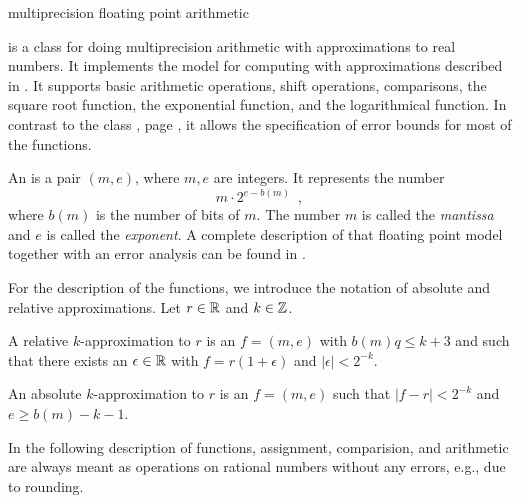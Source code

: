 


\NAME

 \dotfill multiprecision floating point arithmetic



\ABSTRACT

 is a class for doing multiprecision arithmetic with approximations to real
numbers.  It implements the model for computing with approximations described in
\cite{Buchmann/Maurer_TR:1998}.  It supports basic arithmetic operations, shift operations,
comparisons, the square root function, the exponential function, and the logarithmical function.
In contrast to the class , page \pageref{class:bigfloat}, it allows the
specification of error bounds for most of the functions.



\DESCRIPTION

An  is a pair $(m,e)$, where $m,e$ are integers.  It represents the number
\begin{displaymath}
  m \cdot 2^{e-b(m)} \enspace,
\end{displaymath}
where $b(m)$ is the number of bits of $m$.  The number $m$ is called the \emph{mantissa} and $e$
is called the \emph{exponent}.  A complete description of that floating point model together with
an error analysis can be found in \cite{Buchmann/Maurer_TR:1998}.

For the description of the functions, we introduce the notation of absolute and relative
approximations.  Let $r \in \mathbb{R}$ and $k \in \mathbb{Z}$.

A relative $k$-approximation to $r$ is an  $f = (m,e)$ with $b(m) q \leq k+3$
and such that there exists an $\epsilon \in \mathbb{R}$ with $f = r(1+\epsilon)$ and $|\epsilon| <
2^{-k}$.

An absolute $k$-approximation to $r$ is an  $f = (m,e)$ such that $|f-r| <
2^{-k}$ and $e \geq b(m)-k-1$.

In the following description of functions, assignment, comparision, and arithmetic are always
meant as operations on rational numbers without any errors, e.g., due to rounding.


